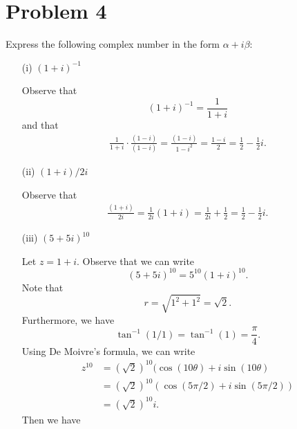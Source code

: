 \documentclass[a4paper]{article}
\begin{document}
    \section*{Problem 4} Express the following complex number in the form \( \alpha + i \beta  \):
        \begin{enumerate}
            \item[(i)] \( (1 + i)^{-1} \)
                \begin{solution}
                   Observe that  
                   \[  (1 + i)^{-1} = \frac{ 1 }{  1 + i }  \]
                   and that 
                   \begin{align*}
                      \frac{ 1 }{  1 + i  }  \cdot \frac{ (1 - i)  }{  (1- i) } = \frac{ (1- i) }{ 1 - i^{2} } = \frac{ 1 - i  }{ 2 } = \frac{ 1 }{ 2 }  - \frac{ 1 }{ 2 }  i.
                   \end{align*}
                \end{solution}
            \item[(ii)] \( (1 + i) / 2i \)
                \begin{solution}
                 Observe that    
                 \begin{align*}
                     \frac{ (1 + i) }{ 2i  }  = \frac{ 1 }{ 2i }  (1 + i) = \frac{ 1 }{ 2i }  + \frac{ 1 }{ 2 } = \frac{ 1 }{ 2 }  - \frac{ 1 }{ 2 }  i.  
                 \end{align*}
                \end{solution}
            \item[(iii)] \( (5 + 5i)^{10} \)
                \begin{solution}
                 Let \( z = 1 + i \). Observe that we can write   
                 \[  (5 + 5i)^{10} = 5^{10} (1 + i)^{10}. \]
                 Note that  
                 \[  r = \sqrt{ 1^{2} + 1^{2} }  = \sqrt{ 2 }. \]
                 Furthermore, we have
                 \[  \tan^{-1}(  1 / 1  ) = \tan^{-1}(1) = \frac{ \pi  }{ 4 }. \]
                 Using De Moivre's formula, we can write
                 \begin{align*}
                     z^{10} &= (\sqrt{ 2 })^{10}  (\cos(10 \theta ) + i \sin(10 \theta) \\
                           &=  (\sqrt{ 2 } )^{10} (\cos(5 \pi / 2 ) + i \sin( 5 \pi / 2)) \\
                           &= (\sqrt{ 2 } )^{10} i.
                \end{align*}
                Then we have

\end{solution}
\end{enumerate}
\end{document}
